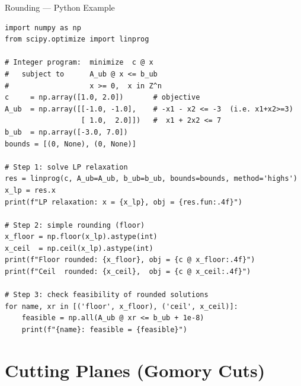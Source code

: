 \documentclass[aspectratio=169,10pt]{beamer}
\begin{document}
\begin{frame}[fragile]{Rounding --- Python Example}
\begin{lstlisting}[style=pystyle, caption={LP relaxation + rounding with scipy}]
import numpy as np
from scipy.optimize import linprog

# Integer program:  minimize  c @ x
#   subject to      A_ub @ x <= b_ub
#                   x >= 0,  x in Z^n
c     = np.array([1.0, 2.0])       # objective
A_ub  = np.array([[-1.0, -1.0],    # -x1 - x2 <= -3  (i.e. x1+x2>=3)
                  [ 1.0,  2.0]])   #  x1 + 2x2 <= 7
b_ub  = np.array([-3.0, 7.0])
bounds = [(0, None), (0, None)]

# Step 1: solve LP relaxation
res = linprog(c, A_ub=A_ub, b_ub=b_ub, bounds=bounds, method='highs')
x_lp = res.x
print(f"LP relaxation: x = {x_lp}, obj = {res.fun:.4f}")

# Step 2: simple rounding (floor)
x_floor = np.floor(x_lp).astype(int)
x_ceil  = np.ceil(x_lp).astype(int)
print(f"Floor rounded: {x_floor}, obj = {c @ x_floor:.4f}")
print(f"Ceil  rounded: {x_ceil},  obj = {c @ x_ceil:.4f}")

# Step 3: check feasibility of rounded solutions
for name, xr in [('floor', x_floor), ('ceil', x_ceil)]:
    feasible = np.all(A_ub @ xr <= b_ub + 1e-8)
    print(f"{name}: feasible = {feasible}")
\end{lstlisting}
\end{frame}

\section{Cutting Planes (Gomory Cuts)}
\end{document}
